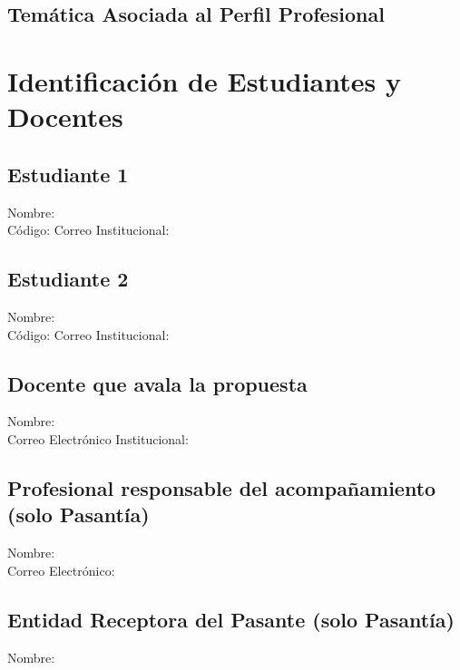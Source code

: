 \documentclass{article}
\begin{document}
\subsection*{Temática Asociada al Perfil Profesional}
\noindent {}

\section*{\sc Identificación de Estudiantes y Docentes}
\subsection*{Estudiante 1}
\noindent Nombre:  \\
Código:  \quad Correo Institucional: 
\subsection*{Estudiante 2}
\noindent Nombre:  \\
Código:  \quad Correo Institucional: 
\subsection*{Docente que avala la propuesta}
\noindent Nombre:  \\
Correo Electrónico Institucional: 
\subsection*{Profesional responsable del acompañamiento {\scriptsize(solo Pasantía)}}
\noindent Nombre:  \\
Correo Electrónico: 
\subsection*{Entidad Receptora del Pasante {\scriptsize{(solo Pasantía)}}}
\noindent Nombre: 
\end{document}
